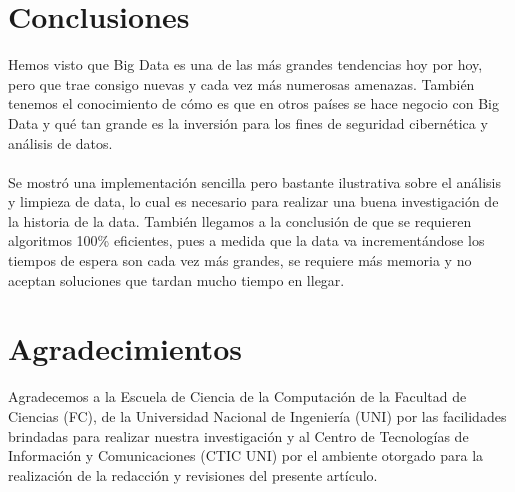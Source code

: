 \documentclass[journal]{IEEEtran}
\begin{document}
\section{Conclusiones}
Hemos visto que Big Data es una de las más grandes tendencias hoy por hoy, pero que trae consigo nuevas y cada vez más numerosas amenazas. También tenemos el conocimiento de cómo es que en otros países se hace negocio con Big Data y qué tan grande es la inversión para los fines de seguridad cibernética y análisis de datos.\\ \\
Se mostró una implementación sencilla pero bastante ilustrativa sobre el análisis y limpieza de data, lo cual es necesario para realizar una buena investigación de la historia de la data. También llegamos a la conclusión de que se requieren algoritmos 100\% eficientes, pues a medida que la data va incrementándose los tiempos de espera son cada vez más grandes, se requiere más memoria y no aceptan soluciones que tardan mucho tiempo en llegar.

\section*{Agradecimientos}
Agradecemos a la Escuela de Ciencia de la Computación de la Facultad de Ciencias (FC), de la Universidad Nacional de Ingeniería (UNI) por las facilidades brindadas para realizar nuestra investigación y al Centro de Tecnologías de Información y Comunicaciones (CTIC UNI) por el ambiente otorgado para la realización de la redacción y revisiones del presente artículo.


\ifCLASSOPTIONcaptionsoff
  \newpage
\fi
\end{document}
